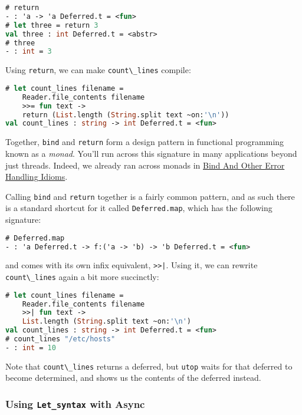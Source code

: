 \begin{lstlisting}[language=Caml]
# return
- : 'a -> 'a Deferred.t = <fun>
# let three = return 3
val three : int Deferred.t = <abstr>
# three
- : int = 3
\end{lstlisting}

Using \passthrough{\lstinline!return!}, we can make
\passthrough{\lstinline!count\_lines!} compile:

\begin{lstlisting}[language=Caml]
# let count_lines filename =
    Reader.file_contents filename
    >>= fun text ->
    return (List.length (String.split text ~on:'\n'))
val count_lines : string -> int Deferred.t = <fun>
\end{lstlisting}

Together, \passthrough{\lstinline!bind!} and
\passthrough{\lstinline!return!} form a design pattern in functional
programming known as a \emph{monad}. You'll run across this signature in
many applications beyond just threads. Indeed, we already ran across
monads in
\href{error-handling.html\#bind-and-other-error-handling-idioms}{Bind
And Other Error Handling Idioms}. 

Calling \passthrough{\lstinline!bind!} and
\passthrough{\lstinline!return!} together is a fairly common pattern,
and as such there is a standard shortcut for it called
\passthrough{\lstinline!Deferred.map!}, which has the following
signature:

\begin{lstlisting}[language=Caml]
# Deferred.map
- : 'a Deferred.t -> f:('a -> 'b) -> 'b Deferred.t = <fun>
\end{lstlisting}

and comes with its own infix equivalent, \passthrough{\lstinline!>>|!}.
Using it, we can rewrite \passthrough{\lstinline!count\_lines!} again a
bit more succinctly:

\begin{lstlisting}[language=Caml]
# let count_lines filename =
    Reader.file_contents filename
    >>| fun text ->
    List.length (String.split text ~on:'\n')
val count_lines : string -> int Deferred.t = <fun>
# count_lines "/etc/hosts"
- : int = 10
\end{lstlisting}

Note that \passthrough{\lstinline!count\_lines!} returns a deferred, but
\passthrough{\lstinline!utop!} waits for that deferred to become
determined, and shows us the contents of the deferred instead.

\hypertarget{using-let_syntax-with-async}{%
\subsubsection{\texorpdfstring{Using \texttt{Let\_syntax} with
Async}{Using Let\_syntax with Async}}\label{using-let_syntax-with-async}}

